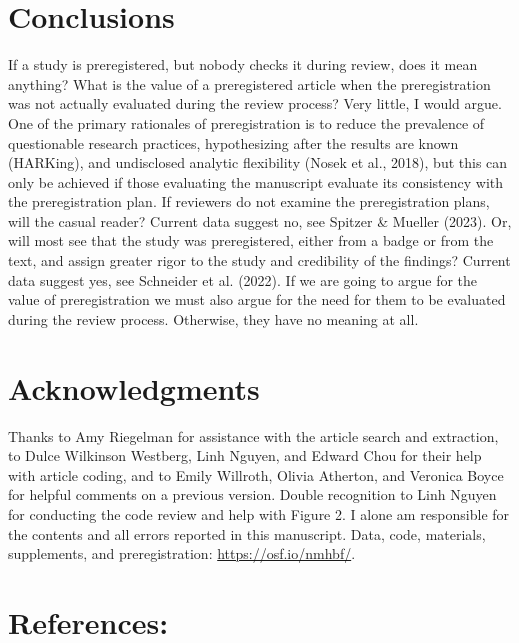 \documentclass[authordate, empirical]{jote-new-article}
\begin{document}
	\section{\textbf{Conclusions}}



	If a study is preregistered, but nobody checks it during review, does it mean anything? What is the value of a preregistered article when the preregistration was not actually evaluated during the review process? Very little, I would argue. One of the primary rationales of preregistration is to reduce the prevalence of questionable research practices, hypothesizing after the results are known (HARKing), and undisclosed analytic flexibility (Nosek et al., 2018), but this can only be achieved if those evaluating the manuscript evaluate its consistency with the preregistration plan. If reviewers do not examine the preregistration plans, will the casual reader? Current data suggest no, see Spitzer \& Mueller (2023). Or, will most see that the study was preregistered, either from a badge or from the text, and assign greater rigor to the study and credibility of the findings? Current data suggest yes, see Schneider et al. (2022). If we are going to argue for the value of preregistration we must also argue for the need for them to be evaluated during the review process. Otherwise, they have no meaning at all.



	\section{\textbf{Acknowledgments}}



	Thanks to Amy Riegelman for assistance with the article search and extraction, to Dulce Wilkinson Westberg, Linh Nguyen, and Edward Chou for their help with article coding, and to Emily Willroth, Olivia Atherton, and Veronica Boyce for helpful comments on a previous version. Double recognition to Linh Nguyen for conducting the code review and help with Figure 2. I alone am responsible for the contents and all errors reported in this manuscript. Data, code, materials, supplements, and preregistration: \url{https://osf.io/nmhbf/}.







	\section{References:}
\end{document}

